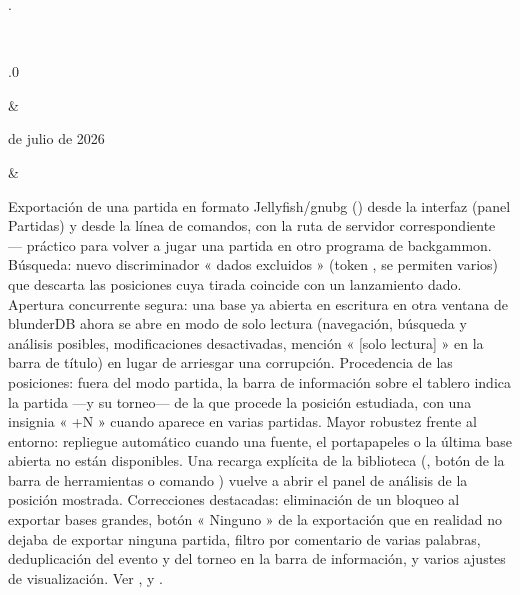 \documentclass[letterpaper,10pt,spanish]{sphinxmanual}
\begin{document}
\begin{savenotes}
\begin{longtable}{}
\begin{varwidth}[t]{}
{\hyperref[\detokenize{telecharge_install:telecharge-install}]{}}.
\sphinxbeforeendvarwidth
\end{varwidth}%
\\
\sphinxhline\begin{varwidth}[t]{}
.0
\sphinxbeforeendvarwidth
\end{varwidth}%
&\begin{varwidth}[t]{}
 de julio de 2026
\sphinxbeforeendvarwidth
\end{varwidth}%
&\begin{varwidth}[t]{}
\sphinxAtStartPar
Exportación de una partida en formato Jellyfish/gnubg () desde la interfaz (panel Partidas) y desde la línea de comandos, con la ruta de servidor correspondiente — práctico para volver a jugar una partida en otro programa de backgammon. Búsqueda: nuevo discriminador « dados excluidos » (token , se permiten varios) que descarta las posiciones cuya tirada coincide con un lanzamiento dado. Apertura concurrente segura: una base ya abierta en escritura en otra ventana de blunderDB ahora se abre en modo de solo lectura (navegación, búsqueda y análisis posibles, modificaciones desactivadas, mención « {[}solo lectura{]} » en la barra de título) en lugar de arriesgar una corrupción. Procedencia de las posiciones: fuera del modo partida, la barra de información sobre el tablero indica la partida —y su torneo— de la que procede la posición estudiada, con una insignia « +N » cuando aparece en varias partidas. Mayor robustez frente al entorno: repliegue automático cuando una fuente, el portapapeles o la última base abierta no están disponibles. Una recarga explícita de la biblioteca (, botón de la barra de herramientas o comando ) vuelve a abrir el panel de análisis de la posición mostrada. Correcciones destacadas: eliminación de un bloqueo al exportar bases grandes, botón « Ninguno » de la exportación que en realidad no dejaba de exportar ninguna partida, filtro por comentario de varias palabras, deduplicación del evento y del torneo en la barra de información, y varios ajustes de visualización. Ver {\hyperref[\detokenize{cmd_mode:cmd-mode}]{}}, {\hyperref[\detokenize{manuel:panneau-matchs}]{}} y {\hyperref[\detokenize{manuel:manuel}]{}}.

\end{varwidth}
\end{longtable}
\end{savenotes}
\end{document}
